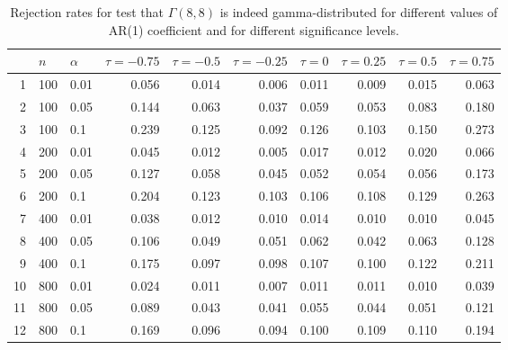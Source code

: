 \begin{table}[ht]
\centering
\caption{Rejection rates for test that $\Gamma(8, 8)$ is 
                   indeed
                   gamma-distributed for
                   different values of AR(1) coefficient and for different 
                   significance levels.} 
\label{table:rr_gamma}
\begin{tabular}{rllrrrrrrr}
  \hline
 & $n$ & $\alpha$ & $\tau = -0.75$ & $\tau = -0.5$ & $\tau = -0.25$ & $\tau = 0$ & $\tau = 0.25$ & $\tau = 0.5$ & $\tau = 0.75$ \\ 
  \hline
1 & 100 & 0.01 & 0.056 & 0.014 & 0.006 & 0.011 & 0.009 & 0.015 & 0.063 \\ 
  2 & 100 & 0.05 & 0.144 & 0.063 & 0.037 & 0.059 & 0.053 & 0.083 & 0.180 \\ 
  3 & 100 & 0.1 & 0.239 & 0.125 & 0.092 & 0.126 & 0.103 & 0.150 & 0.273 \\ 
  4 & 200 & 0.01 & 0.045 & 0.012 & 0.005 & 0.017 & 0.012 & 0.020 & 0.066 \\ 
  5 & 200 & 0.05 & 0.127 & 0.058 & 0.045 & 0.052 & 0.054 & 0.056 & 0.173 \\ 
  6 & 200 & 0.1 & 0.204 & 0.123 & 0.103 & 0.106 & 0.108 & 0.129 & 0.263 \\ 
  7 & 400 & 0.01 & 0.038 & 0.012 & 0.010 & 0.014 & 0.010 & 0.010 & 0.045 \\ 
  8 & 400 & 0.05 & 0.106 & 0.049 & 0.051 & 0.062 & 0.042 & 0.063 & 0.128 \\ 
  9 & 400 & 0.1 & 0.175 & 0.097 & 0.098 & 0.107 & 0.100 & 0.122 & 0.211 \\ 
  10 & 800 & 0.01 & 0.024 & 0.011 & 0.007 & 0.011 & 0.011 & 0.010 & 0.039 \\ 
  11 & 800 & 0.05 & 0.089 & 0.043 & 0.041 & 0.055 & 0.044 & 0.051 & 0.121 \\ 
  12 & 800 & 0.1 & 0.169 & 0.096 & 0.094 & 0.100 & 0.109 & 0.110 & 0.194 \\ 
   \hline
\end{tabular}
\end{table}

